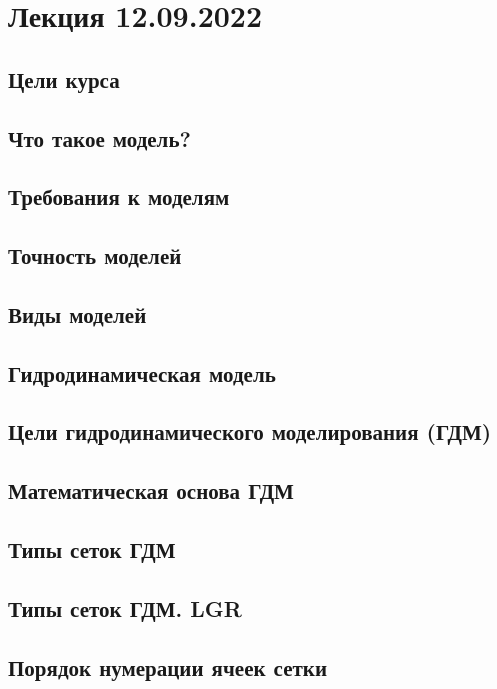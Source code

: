 \documentclass[main.tex]{subfiles}
\begin{document}
\section{Лекция 12.09.2022}

\subsection{Цели курса}

\subsection{Что такое модель?}

\subsection{Требования к моделям}

\subsection{Точность моделей}

\subsection{Виды моделей}

\subsection{Гидродинамическая модель}

\subsection{Цели гидродинамического моделирования (ГДМ)}

\subsection{Математическая основа ГДМ}

\subsection{Типы сеток ГДМ}

\subsection{Типы сеток ГДМ. LGR}

\subsection{Порядок нумерации ячеек сетки}
\end{document}
